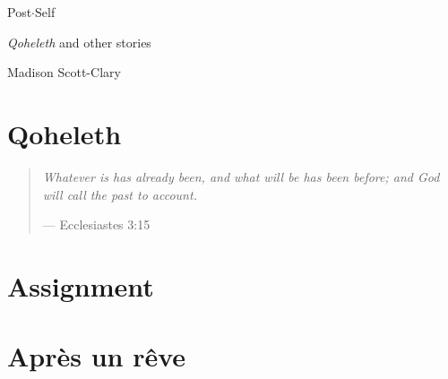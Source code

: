 \documentclass[11pt]{memoir}
\begin{document}
  \frontmatter

  

  \pagestyle{plain}

  \doublespacing

  \begin{flushright}
    \null
    \vfill
    {\Huge\DisplayFont Post$\cdot$Self}

    {\Large\DisplayFont \emph{Qoheleth} and other stories}

    \vfill

    {\Large\DisplayFont Madison Scott-Clary}
  \end{flushright}
  \thispagestyle{empty}

  \newpage

  

  \tableofcontents*
  \newpage
  \null
  \cleardoublepage

  \onehalfspacing


  \mainmatter

  \pagestyle{ourbook}

  \cleardoublepage
  \part*{Qoheleth}
  \null
  \thispagestyle{empty}
  \vfill
  \begin{quote}
    \emph{Whatever is has already been, and what will be has been \mbox{before;} and God will call the past to account.}

    --- Ecclesiastes 3:15
  \end{quote}
  \vfill
  
  
  
  

  \cleartoverso
  \part*{Assignment}
  

  \cleartoverso
  \part*{Après un rêve}
  
\end{document}
